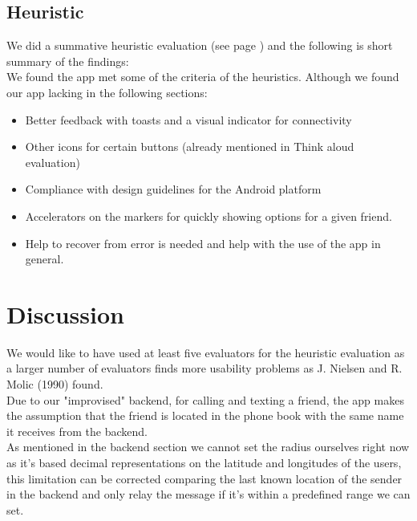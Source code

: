 \documentclass[runningheads,a4paper]{llncs}
\begin{document}
\subsection*{Heuristic}
We did a summative heuristic evaluation (see page \pageref{heuristic}) and the following is short summary of the findings: \\

We found the app met some of the criteria of the heuristics. Although we found our app lacking in the following sections:
\begin{itemize}
\item Better feedback with toasts and a visual indicator for connectivity
\item Other icons for certain buttons (already mentioned in Think aloud evaluation)
\item Compliance with design guidelines for the Android platform
\item Accelerators on the markers for quickly showing options for a given friend.
\item Help to recover from error is needed and help with the use of the app in general.
\end{itemize}
\section{Discussion}
We would like to have used at least five evaluators for the heuristic evaluation as a larger number of evaluators finds more usability problems as J. Nielsen and R. Molic (1990) found.\cite{heuristics}\\
Due to our "improvised" backend, for calling and texting a friend, the app makes the assumption that the friend is located in the phone book with the same name it receives from the backend.\\
As mentioned in the backend section we cannot set the radius ourselves right now as it's based decimal representations on the latitude and longitudes of the users, this limitation can be corrected comparing the last known location of the sender in the backend and only relay the message if it's within a predefined range we can set.
\end{document}

